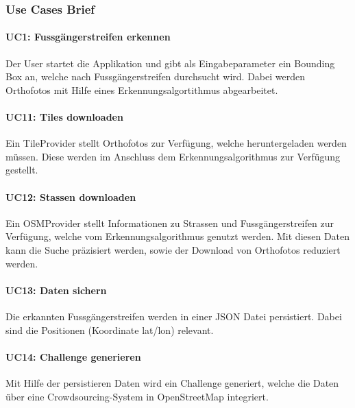 \subsubsection{Use Cases Brief}
\paragraph{UC1: Fussgängerstreifen erkennen}
Der User startet die Applikation und gibt als Eingabeparameter ein Bounding Box an, welche nach Fussgängerstreifen durchsucht wird. Dabei werden Orthofotos mit Hilfe eines Erkennungsalgortithmus abgearbeitet.

\paragraph{UC11: Tiles downloaden} 
Ein TileProvider stellt Orthofotos zur Verfügung, welche heruntergeladen werden müssen. Diese werden im Anschluss dem Erkennungsalgorithmus zur Verfügung gestellt.

\paragraph{UC12: Stassen downloaden}
Ein OSMProvider stellt Informationen zu Strassen und Fussgängerstreifen zur Verfügung, welche vom Erkennungsalgorithmus genutzt werden. Mit diesen Daten kann die Suche präzisiert werden, sowie der Download von Orthofotos reduziert werden.

\paragraph{UC13: Daten sichern}
Die erkannten Fussgängerstreifen werden in einer JSON Datei persistiert. Dabei sind die Positionen (Koordinate lat/lon) relevant.

\paragraph{UC14: Challenge generieren}
Mit Hilfe der persistieren Daten wird ein Challenge generiert, welche die Daten über eine Crowdsourcing-System in OpenStreetMap integriert.

